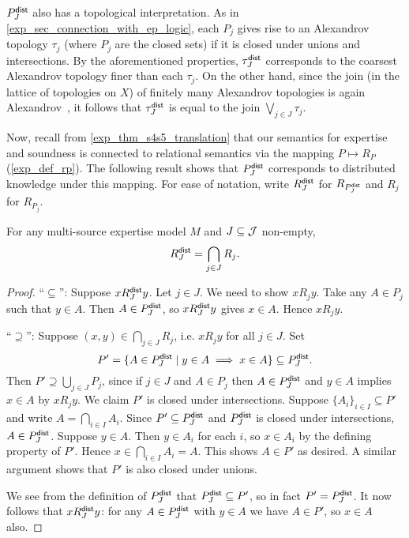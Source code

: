 $P^{\mathsf{dist}}_J$ also has a topological interpretation. As in
\cref{exp_sec_connection_with_ep_logic}, each $P_j$ gives rise to an Alexandrov
topology $\tau_j$ (where $P_j$ are the closed sets) if it is closed under
unions and intersections. By the aforementioned properties, $\tau^{\mathsf{dist}}_J$
corresponds to the coarsest Alexandrov topology finer than each $\tau_j$. On
the other hand, since the join (in the lattice of topologies on $X$) of
finitely many Alexandrov topologies is again Alexandrov~\cite[Theorems 2.4,
2.5]{steiner1966lattice}, it follows that $\tau^{\mathsf{dist}}_J$ is equal to the join
$\bigvee_{j \in J}{\tau_j}$.

Now, recall from \cref{exp_thm_s4s5_translation} that our semantics for
expertise and soundness is connected to relational semantics via the mapping
$P \mapsto R_P$ (\cref{exp_def_rp}). The following result shows that
$P^{\mathsf{dist}}_J$ corresponds to distributed knowledge under this mapping. For
ease of notation, write $R^{\mathsf{dist}}_J$ for $R_{P^{\mathsf{dist}}_J}$ and
$R_j$ for $R_{P_j}$.

\begin{proposition}
\label{exp_prop_rpdist}
For any multi-source expertise model $M$ and $J \subseteq \mathcal{J}$ non-empty,
\[
R^{\mathsf{dist}}_J = \bigcap_{j \in J}{R_j}.\]
\end{proposition}

\begin{proof}
    ``$\subseteq$'': Suppose $x{R^{\mathsf{dist}}_J}y$. Let $j \in J$.  We need to show
    $x{R_j}y$. Take any $A \in P_j$ such that $y \in A$. Then $A \in P^{\mathsf{dist}}_J$,
    so $x{R^{\mathsf{dist}}_J}y$ gives $x \in A$. Hence $x{R_j}y$.

    ``$\supseteq$'': Suppose $(x, y) \in \bigcap_{j \in J}{R_j}$, i.e. $x{R_j}y$
    for all $j \in J$. Set
    \[
        P' = \{A \in P^{\mathsf{dist}}_J \mid y \in A \implies x \in A\}
        \subseteq P^{\mathsf{dist}}_J.
    \]
    Then $P' \supseteq \bigcup_{j \in J}{P_j}$, since if $j \in J$ and $A \in
    P_j$ then $A \in P^{\mathsf{dist}}_J$ and $y \in A$ implies $x \in A$ by $x{R_j}y$.
    We claim $P'$ is closed under intersections. Suppose $\{A_i\}_{i \in I}
    \subseteq P'$ and write $A = \bigcap_{i \in I}{A_i}$. Since $P' \subseteq
    P^{\mathsf{dist}}_J$ and $P^{\mathsf{dist}}_J$ is closed under intersections, $A \in P^{\mathsf{dist}}_J$.
    Suppose $y \in A$.  Then $y \in A_i$ for each $i$, so $x \in A_i$ by the
    defining property of $P'$. Hence $x \in \bigcap_{i \in I}{A_i} = A$. This
    shows $A \in P'$ as desired. A similar argument shows that $P'$ is also
    closed under unions.

    We see from the definition of $P^{\mathsf{dist}}_J$ that $P^{\mathsf{dist}}_J \subseteq P'$, so
    in fact $P' = P^{\mathsf{dist}}_J$. It now follows that $x{R^{\mathsf{dist}}_J}y$: for any $A \in
    P^{\mathsf{dist}}_J$ with $y \in A$ we have $A \in P'$, so $x \in A$ also.
\end{proof}


